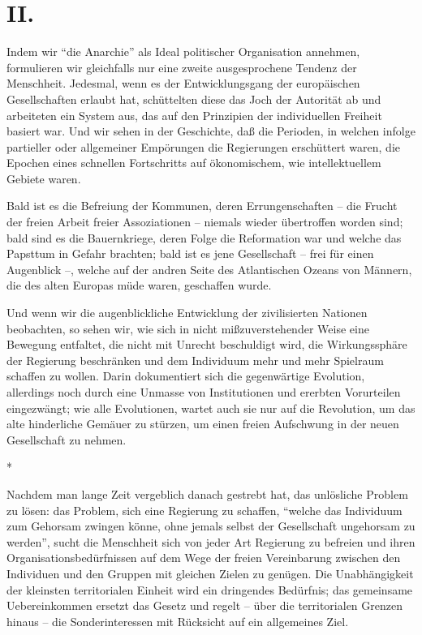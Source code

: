 \documentclass{scrbook}
\begin{document}
\section*{II.}

Indem wir ``die Anarchie'' als Ideal politischer Organisation annehmen, formulieren wir gleichfalls nur eine zweite ausgesprochene Tendenz der Menschheit. Jedesmal, wenn es der Entwicklungsgang der europäischen Gesellschaften erlaubt hat, schüttelten diese das Joch der Autorität ab und arbeiteten ein System aus, das auf den Prinzipien der individuellen Freiheit basiert war. Und wir sehen in der Geschichte, daß die Perioden, in welchen infolge partieller oder allgemeiner Empörungen die Regierungen erschüttert waren, die Epochen eines schnellen Fortschritts auf ökonomischem, wie intellektuellem Gebiete waren.

Bald ist es die Befreiung der Kommunen, deren Errungenschaften – die Frucht der freien Arbeit freier Assoziationen – niemals wieder übertroffen worden sind; bald sind es die Bauernkriege, deren Folge die Reformation war und welche das Papsttum in Gefahr brachten; bald ist es jene Gesellschaft – frei für einen Augenblick –, welche auf der andren Seite des Atlantischen Ozeans von Männern, die des alten Europas müde waren, geschaffen wurde.

Und wenn wir die augenblickliche Entwicklung der zivilisierten Nationen beobachten, so sehen wir, wie sich in nicht mißzuverstehender Weise eine Bewegung entfaltet, die nicht mit Unrecht beschuldigt wird, die Wirkungssphäre der Regierung beschränken und dem Individuum mehr und mehr Spielraum schaffen zu wollen. Darin dokumentiert sich die gegenwärtige Evolution, allerdings noch durch eine Unmasse von Institutionen und ererbten Vorurteilen eingezwängt; wie alle Evolutionen, wartet auch sie nur auf die Revolution, um das alte hinderliche Gemäuer zu stürzen, um einen freien Aufschwung in der neuen Gesellschaft zu nehmen.

\begin{center}*\end{center}

Nachdem man lange Zeit vergeblich danach gestrebt hat, das unlösliche Problem zu lösen: das Problem, sich eine Regierung zu schaffen, ``welche das Individuum zum Gehorsam zwingen könne, ohne jemals selbst der Gesellschaft ungehorsam zu werden'', sucht die Menschheit sich von jeder Art Regierung zu befreien und ihren Organisationsbedürfnissen auf dem Wege der freien Vereinbarung zwischen den Individuen und den Gruppen mit gleichen Zielen zu genügen. Die Unabhängigkeit der kleinsten territorialen Einheit wird ein dringendes Bedürfnis; das gemeinsame Uebereinkommen ersetzt das Gesetz und regelt – über die territorialen Grenzen hinaus – die Sonderinteressen mit Rücksicht auf ein allgemeines Ziel.
\end{document}
